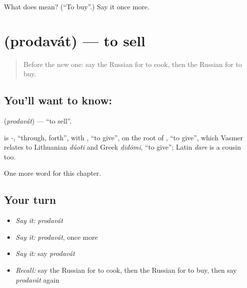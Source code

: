 \begin{tcolorbox}[breakable,colback=teal!4,colframe=teal!35!black,title={Before you move on}]
What does  mean? (\textquotedblleft{}To buy\textquotedblright{}.) Say it once more.
\end{tcolorbox}
\section[\texorpdfstring{\ru{продавать} (prodavát)}{продавать (prodavát)}]{ (prodavát) — to sell}

\label{lesson:RU-C39-prodavat}



\begin{quote}
Before the new one: say the Russian for to cook, then the Russian for to buy.
\end{quote}

\subsection*{You'll want to know: }
\textbf{} (\emph{prodavát}) — \textquotedblleft{}to sell\textquotedblright{}.

\begin{cousinweb}
\textbf{} is \emph{-}, \textquotedblleft{}through, forth\textquotedblright{}, with \emph{}, \textquotedblleft{}to give\textquotedblright{}, on the root of \emph{}, \textquotedblleft{}to give\textquotedblright{}, which Vasmer relates to Lithuanian \emph{dúoti} and Greek \emph{didōmi}, \textquotedblleft{}to give\textquotedblright{}; Latin \emph{dare} is a cousin too.
\end{cousinweb}

\begin{grammarlens}[title={What you've built}]
One more word for this chapter.
\end{grammarlens}

\subsection*{Your turn}
\begin{itemize}
\raggedright
  \item \emph{Say it:} \emph{prodavát}
  \item \emph{Say it:} \emph{prodavát}, once more
  \item \emph{Say it:} say \emph{prodavát}
  \item \emph{Recall:} say the Russian for to cook, then the Russian for to buy, then say \emph{prodavát} again
\end{itemize}

